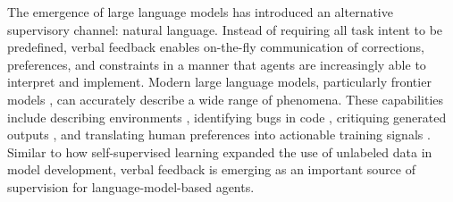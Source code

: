 The emergence of large language models \citep{brown2020language} has introduced an alternative supervisory channel: natural language. Instead of requiring all task intent to be predefined, verbal feedback enables on-the-fly communication of corrections, preferences, and constraints in a manner that agents are increasingly able to interpret and implement. Modern large language models, particularly frontier models \citep{achiam2023gpt}, can accurately describe a wide range of phenomena. These capabilities include describing environments \citep{wang2023voyager}, identifying bugs in code \citep{mcaleese2024criticgpt}, critiquing generated outputs \citep{madaan2023selfrefine}, and translating human preferences into actionable training signals \citep{hong2024orpo, meng2024simpo}. Similar to how self-supervised learning \citep{devlin2019bertpretrainingdeepbidirectional, chen2020simple} expanded the use of unlabeled data in model development, verbal feedback is emerging as an important source of supervision for language-model-based agents. 




